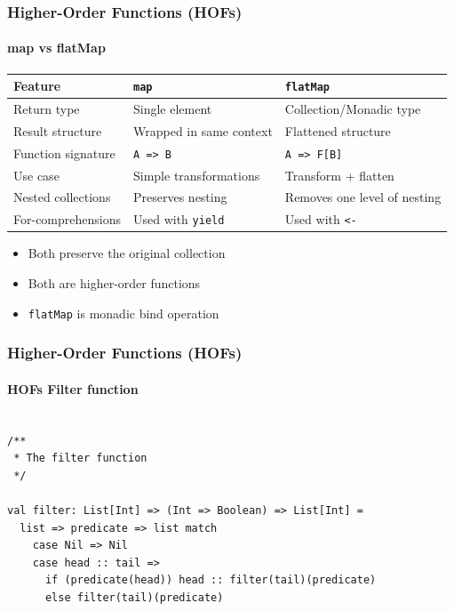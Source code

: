 \documentclass{beamer}
\begin{document}
\begin{frame}[fragile]
\frametitle{Higher-Order Functions (HOFs)}
\framesubtitle{map vs flatMap}
\centering
\begin{tabular}{lll}
\toprule
\textbf{Feature} & \texttt{map} & \texttt{flatMap} \\
\midrule
Return type & Single element & Collection/Monadic type \\
\addlinespace
Result structure & Wrapped in same context & Flattened structure \\
\addlinespace
Function signature & \texttt{A => B} & \texttt{A => F[B]} \\
\addlinespace
Use case & Simple transformations & Transform + flatten \\
\addlinespace
Nested collections & Preserves nesting & Removes one level of nesting \\
\addlinespace
For-comprehensions & Used with \texttt{yield} & Used with \texttt{<-} \\
\bottomrule
\end{tabular}

\vspace{1em}
\begin{itemize}
\item Both preserve the original collection
\item Both are higher-order functions
\item \texttt{flatMap} is monadic bind operation
\end{itemize}
\end{frame}



\begin{frame}[fragile]
\frametitle{Higher-Order Functions (HOFs)}
\framesubtitle{HOFs Filter function}

\begin{lstlisting}[style=scalaStyle]

/**
 * The filter function 
 */

val filter: List[Int] => (Int => Boolean) => List[Int] =
  list => predicate => list match
    case Nil => Nil
    case head :: tail =>
      if (predicate(head)) head :: filter(tail)(predicate)
      else filter(tail)(predicate)


\end{lstlisting}

\end{frame}
\end{document}
